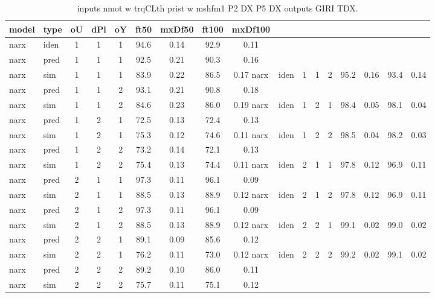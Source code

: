 \begin{center} 
\begin{longtable}{ll|ccc|cc|cc} 
\caption[inputs nmot w trqCLth prist w mshfm1 P2 DX P5 DX   outputs GIRI TDX]{inputs nmot w trqCLth prist w mshfm1 P2 DX P5 DX   outputs GIRI TDX.} 
\label{tab:inputs_nmot_w_trqCLth_prist_w_mshfm1_P2_DX_P5_DX___outputs_GIRI_TDX} 
\hline 
  model & type & oU & dPl & oY & ft50 & mxDf50 & ft100 & mxDf100 \\ 
 \hline 
narx & iden & 1 & 1 & 1 & 94.6 & 0.14 & 92.9 & 0.11 \\ 
narx & pred & 1 & 1 & 1 & 92.5 & 0.21 & 90.3 & 0.16 \\ 
narx & sim  & 1 & 1 & 1 & 83.9 & 0.22 & 86.5 & 0.17 
 \hline 
narx & iden & 1 & 1 & 2 & 95.2 & 0.16 & 93.4 & 0.14 \\ 
narx & pred & 1 & 1 & 2 & 93.1 & 0.21 & 90.8 & 0.18 \\ 
narx & sim  & 1 & 1 & 2 & 84.6 & 0.23 & 86.0 & 0.19 
 \hline 
narx & iden & 1 & 2 & 1 & 98.4 & 0.05 & 98.1 & 0.04 \\ 
narx & pred & 1 & 2 & 1 & 72.5 & 0.13 & 72.4 & 0.13 \\ 
narx & sim  & 1 & 2 & 1 & 75.3 & 0.12 & 74.6 & 0.11 
 \hline 
narx & iden & 1 & 2 & 2 & 98.5 & 0.04 & 98.2 & 0.03 \\ 
narx & pred & 1 & 2 & 2 & 73.2 & 0.14 & 72.1 & 0.13 \\ 
narx & sim  & 1 & 2 & 2 & 75.4 & 0.13 & 74.4 & 0.11 
 \hline 
narx & iden & 2 & 1 & 1 & 97.8 & 0.12 & 96.9 & 0.11 \\ 
narx & pred & 2 & 1 & 1 & 97.3 & 0.11 & 96.1 & 0.09 \\ 
narx & sim  & 2 & 1 & 1 & 88.5 & 0.13 & 88.9 & 0.12 
 \hline 
narx & iden & 2 & 1 & 2 & 97.8 & 0.12 & 96.9 & 0.11 \\ 
narx & pred & 2 & 1 & 2 & 97.3 & 0.11 & 96.1 & 0.09 \\ 
narx & sim  & 2 & 1 & 2 & 88.5 & 0.13 & 88.9 & 0.12 
 \hline 
narx & iden & 2 & 2 & 1 & 99.1 & 0.02 & 99.0 & 0.02 \\ 
narx & pred & 2 & 2 & 1 & 89.1 & 0.09 & 85.6 & 0.12 \\ 
narx & sim  & 2 & 2 & 1 & 76.2 & 0.11 & 73.0 & 0.12 
 \hline 
narx & iden & 2 & 2 & 2 & 99.2 & 0.02 & 99.1 & 0.02 \\ 
narx & pred & 2 & 2 & 2 & 89.2 & 0.10 & 86.0 & 0.11 \\ 
narx & sim  & 2 & 2 & 2 & 75.7 & 0.11 & 75.1 & 0.12 
 \hline 
\end{longtable} 
\end{center}
